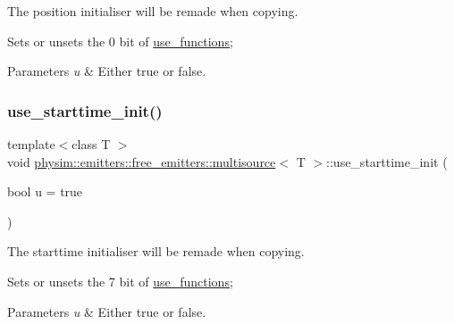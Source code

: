 The position initialiser will be remade when copying. 

Sets or unsets the 0 bit of \hyperlink{classphysim_1_1emitters_1_1free__emitters_1_1multisource_a99bad5ac0fb5cb14652bbfd0c1f0eeff}{use\+\_\+functions}; 
\begin{DoxyParams}{Parameters}
{\em u} & Either true or false. \\
\hline
\end{DoxyParams}
\mbox{\label{classphysim_1_1emitters_1_1free__emitters_1_1multisource_a89210347706352017c867877bc16fbec}} 
\subsubsection{\texorpdfstring{use\+\_\+starttime\+\_\+init()}{use\_starttime\_init()}}
{\footnotesize\ttfamily template$<$class T $>$ \\
void \hyperlink{classphysim_1_1emitters_1_1free__emitters_1_1multisource}{physim\+::emitters\+::free\+\_\+emitters\+::multisource}$<$ T $>$\+::use\+\_\+starttime\+\_\+init (\begin{DoxyParamCaption}\item[{bool}]{u = {\ttfamily true} }\end{DoxyParamCaption})}



The starttime initialiser will be remade when copying. 

Sets or unsets the 7 bit of \hyperlink{classphysim_1_1emitters_1_1free__emitters_1_1multisource_a99bad5ac0fb5cb14652bbfd0c1f0eeff}{use\+\_\+functions}; 
\begin{DoxyParams}{Parameters}
{\em u} & Either true or false. \\
\hline
\end{DoxyParams}
\mbox{\label{classphysim_1_1emitters_1_1free__emitters_1_1multisource_a05fbb3684dbcfdebd7daea7ccbd75cf9}} 

